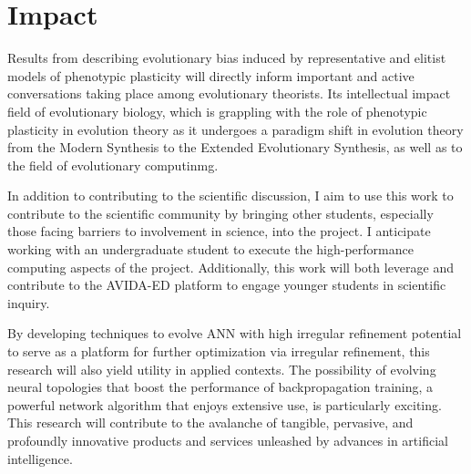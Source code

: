 \section{Impact}

Results from  describing evolutionary bias induced by representative and elitist models of phenotypic plasticity will directly inform important and active conversations taking place among evolutionary theorists.
Its intellectual impact field of evolutionary biology, which is grappling with the role of phenotypic plasticity in evolution theory as it undergoes a paradigm shift in evolution theory from the Modern Synthesis to the Extended Evolutionary Synthesis, as well as to the field of evolutionary computinmg.\autocite{Pigliucci2008IsEvolvable}

In addition to contributing to the scientific discussion, I aim to use this work to contribute to the scientific community by bringing other students, especially those facing barriers to involvement in science, into the project.
I anticipate working with an undergraduate student to execute the high-performance computing aspects of the project.
Additionally, this work will both leverage and contribute to the AVIDA-ED platform to engage younger students in scientific inquiry.

By developing techniques to evolve ANN with high irregular refinement potential to serve as a platform for further optimization via irregular refinement, this research will also yield utility in applied contexts.
The possibility of evolving neural topologies that boost the performance of backpropagation training, a powerful network algorithm that enjoys extensive use, is particularly exciting.
This research will contribute to the avalanche of tangible, pervasive, and profoundly innovative products and services unleashed by advances in artificial intelligence.
